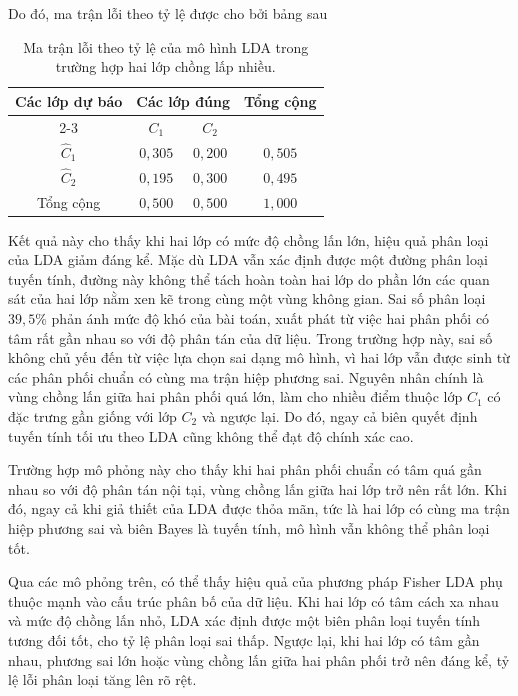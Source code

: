 Do đó, ma trận lỗi theo tỷ lệ được cho bởi bảng sau
\begin{table}[H]
	\centering
	\begin{tabular}{|c|cc|c|}
		\hline
		\multirow{2}{*}{Các lớp dự báo} 
		& \multicolumn{2}{c|}{Các lớp đúng} 
		& \multirow{2}{*}{Tổng cộng} \\ \cline{2-3}
		& $C_1$ & $C_2$ & \\ \hline
		$\hat{C}_1$ & $0{,}305$ & $0{,}200$ & $0{,}505$ \\
		$\hat{C}_2$ & $0{,}195$ & $0{,}300$ & $0{,}495$ \\ \hline
		Tổng cộng & $0{,}500$ & $0{,}500$  & $1{,}000$ \\ \hline
	\end{tabular}
	\caption{Ma trận lỗi theo tỷ lệ của mô hình LDA trong trường hợp hai lớp chồng lấp nhiều.}
	\label{tab:MaTranLoiTyLe_LDA_ChongLanNhieu}
\end{table}

Kết quả này cho thấy khi hai lớp có mức độ chồng lấn lớn, hiệu quả phân loại của LDA giảm đáng kể. Mặc dù LDA vẫn xác định được một đường phân loại tuyến tính, đường này không thể tách hoàn toàn hai lớp do phần lớn các quan sát của hai lớp nằm xen kẽ trong cùng một vùng không gian. Sai số phân loại $39{,}5\%$ phản ánh mức độ khó của bài toán, xuất phát từ việc hai phân phối có tâm rất gần nhau so với độ phân tán của dữ liệu. Trong trường hợp này, sai số không chủ yếu đến từ việc lựa chọn sai dạng mô hình, vì hai lớp vẫn được sinh từ các phân phối chuẩn có cùng ma trận hiệp phương sai. Nguyên nhân chính là vùng chồng lấn giữa hai phân phối quá lớn, làm cho nhiều điểm thuộc lớp $C_1$ có đặc trưng gần giống với lớp $C_2$ và ngược lại. Do đó, ngay cả biên quyết định tuyến tính tối ưu theo LDA cũng không thể đạt độ chính xác cao.

\hspace*{0.5cm}Trường hợp mô phỏng này cho thấy khi hai phân phối chuẩn có tâm quá gần nhau so với độ phân tán nội tại, vùng chồng lấn giữa hai lớp trở nên rất lớn. Khi đó, ngay cả khi giả thiết của LDA được thỏa mãn, tức là hai lớp có cùng ma trận hiệp phương sai và biên Bayes là tuyến tính, mô hình vẫn không thể phân loại tốt.

Qua các mô phỏng trên, có thể thấy hiệu quả của phương pháp Fisher LDA phụ thuộc mạnh vào cấu trúc phân bố của dữ liệu. Khi hai lớp có tâm cách xa nhau và mức độ chồng lấn nhỏ, LDA xác định được một biên phân loại tuyến tính tương đối tốt, cho tỷ lệ phân loại sai thấp. Ngược lại, khi hai lớp có tâm gần nhau, phương sai lớn hoặc vùng chồng lấn giữa hai phân phối trở nên đáng kể, tỷ lệ lỗi phân loại tăng lên rõ rệt.

